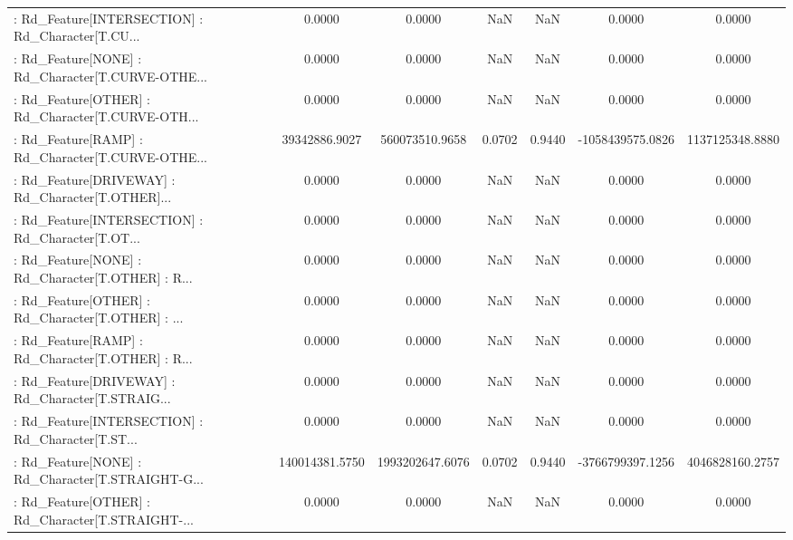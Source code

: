 \begin{longtable}{p{4cm}cccccc}
 : Rd\_Feature[INTERSECTION] : Rd\_Character[T.CU... &            0.0000 &            0.0000 &     NaN &          NaN &             0.0000 &            0.0000 \\
 : Rd\_Feature[NONE] : Rd\_Character[T.CURVE-OTHE... &            0.0000 &            0.0000 &     NaN &          NaN &             0.0000 &            0.0000 \\
 : Rd\_Feature[OTHER] : Rd\_Character[T.CURVE-OTH... &            0.0000 &            0.0000 &     NaN &          NaN &             0.0000 &            0.0000 \\
 : Rd\_Feature[RAMP] : Rd\_Character[T.CURVE-OTHE... &     39342886.9027 &    560073510.9658 &  0.0702 &       0.9440 &   -1058439575.0826 &   1137125348.8880 \\
 : Rd\_Feature[DRIVEWAY] : Rd\_Character[T.OTHER]... &            0.0000 &            0.0000 &     NaN &          NaN &             0.0000 &            0.0000 \\
 : Rd\_Feature[INTERSECTION] : Rd\_Character[T.OT... &            0.0000 &            0.0000 &     NaN &          NaN &             0.0000 &            0.0000 \\
 : Rd\_Feature[NONE] : Rd\_Character[T.OTHER] : R... &            0.0000 &            0.0000 &     NaN &          NaN &             0.0000 &            0.0000 \\
 : Rd\_Feature[OTHER] : Rd\_Character[T.OTHER] : ... &            0.0000 &            0.0000 &     NaN &          NaN &             0.0000 &            0.0000 \\
 : Rd\_Feature[RAMP] : Rd\_Character[T.OTHER] : R... &            0.0000 &            0.0000 &     NaN &          NaN &             0.0000 &            0.0000 \\
 : Rd\_Feature[DRIVEWAY] : Rd\_Character[T.STRAIG... &            0.0000 &            0.0000 &     NaN &          NaN &             0.0000 &            0.0000 \\
 : Rd\_Feature[INTERSECTION] : Rd\_Character[T.ST... &            0.0000 &            0.0000 &     NaN &          NaN &             0.0000 &            0.0000 \\
 : Rd\_Feature[NONE] : Rd\_Character[T.STRAIGHT-G... &    140014381.5750 &   1993202647.6076 &  0.0702 &       0.9440 &   -3766799397.1256 &   4046828160.2757 \\
 : Rd\_Feature[OTHER] : Rd\_Character[T.STRAIGHT-... &            0.0000 &            0.0000 &     NaN &          NaN &             0.0000 &            0.0000 \\

\end{longtable}
